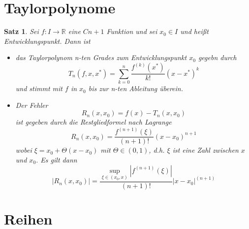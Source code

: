 \documentclass[12pt,a4paper]{article}%
\newtheorem{satz}{Satz}[section]
\numberwithin{equation}{section}
\newcommand{\R}{\mathbb{R}} %
\numberwithin{equation}{subsection}
\begin{document}
\section{Taylorpolynome}
  \begin{satz}
  Sei $f:I\rightarrow \R$ eine $C{n+1}$ Funktion und sei $x_0 \in I$ und heißt Entwicklungspunkt. Dann ist
  \begin{itemize}
    \item[a) ] das Taylorpolynom n-ten Grades zum Entwicklungspunkt $x_0$ gegebn durch
    \begin{equation}
    T_n(f, x, x^*) = \sum\limits_{k= 0}^n \frac{f^{(k)}(x^*)}{k!} (x-x^*)^k
    \end{equation}
    und stimmt mit $f$ in $x_0$ bis zur n-ten Ableitung überein.
    \item[b) ] Der Fehler 
    \begin{equation}
      R_n(x,x_0) = f(x) - T_n(x,x_0)
    \end{equation}
    ist gegeben durch die Restgliedformel nach Lagrange
    \begin{equation}
      R_n(x,x_0) = \frac{f^{(n+1)}(\xi)}{(n+1)!}(x-x_0)^{n+1}
    \end{equation}
    wobei $\xi = x_0 + \Theta (x-x_0)$ mit $\Theta \in (0,1)$, d.h. $\xi$ ist eine Zahl zwischen $x$ und $x_0$. Es gilt dann
    \begin{equation}
      \big|R_n(x,x_0)\big| = \frac{\sup\limits_{\xi \in (x_0,x)} \left|f^{(n+1)}(\xi)\right|}{(n+1)!}|x-x_0|^{(n+1)}
    \end{equation}
  \end{itemize}
  \end{satz}  
\newpage

\section{Reihen}
\end{document}
